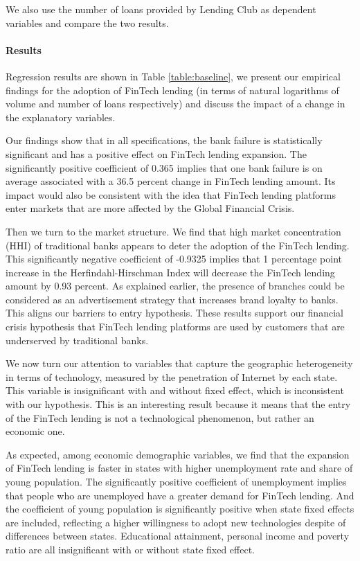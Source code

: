 \documentclass[11pt, a4paper, leqno]{article}
\begin{document}
We also use the number of loans provided by Lending Club as dependent variables and compare the two results.

\paragraph{Results}
Regression results are shown in Table \ref{table:baseline}, we present our empirical findings for the adoption of FinTech lending (in terms of natural logarithms of volume and number of loans respectively) and discuss the impact of a change in the explanatory variables. 

Our findings show that in all specifications, the bank failure is statistically significant and has a positive effect on FinTech lending expansion. The significantly positive coefficient of 0.365 implies that one bank failure is on average associated with a 36.5 percent change in FinTech lending amount. Its impact would also be consistent with the idea that FinTech lending platforms enter markets that are more affected by the Global Financial Crisis.

Then we turn to the market structure. We find that high market concentration (HHI) of traditional banks appears to deter the adoption of the FinTech lending. This significantly negative coefficient of -0.9325 implies that 1 percentage point increase in the Herfindahl-Hirschman Index will decrease the FinTech lending amount by 0.93 percent. As explained earlier, the presence of branches could be considered as an advertisement strategy that increases brand loyalty to banks. This aligns our barriers to entry hypothesis. These results support our financial crisis hypothesis that FinTech lending platforms are used by customers that are underserved by traditional banks. 

We now turn our attention to variables that capture the geographic heterogeneity in terms of technology, measured by the penetration of Internet by each state. This variable is insignificant with and without fixed effect, which is inconsistent with our hypothesis. This is an interesting result because it means that the entry of the FinTech lending is not a technological phenomenon, but rather an economic one. 

As expected, among economic demographic variables, we find that the expansion of FinTech lending is faster in states with higher unemployment rate and share of young population. The significantly positive coefficient of unemployment implies that people who are unemployed have a greater demand for FinTech lending. And the coefficient of young population is significantly positive when state fixed effects are included, reflecting a higher willingness to adopt new technologies despite of differences between states. Educational attainment, personal income and poverty ratio are all insignificant with or without state fixed effect.
\end{document}
